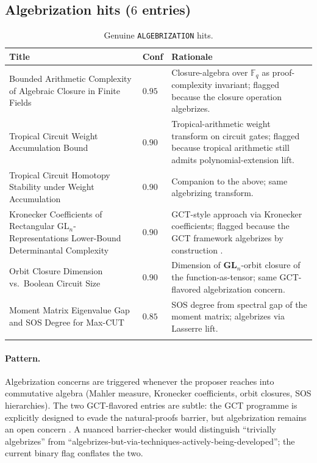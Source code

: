 \documentclass[11pt,a4paper]{article}
\begin{document}
\subsection{Algebrization hits ($6$ entries)}\label{sec:alg-genuine}

\begin{longtable}{p{3.5cm} p{0.8cm} p{10.0cm}}
\toprule
Title & Conf & Rationale \\
\midrule
Bounded Arithmetic Complexity of Algebraic Closure in Finite Fields & $0.95$ & Closure-algebra over $\mathbb{F}_q$ as proof-complexity invariant; flagged because the closure operation algebrizes. \\
Tropical Circuit Weight Accumulation Bound & $0.90$ & Tropical-arithmetic weight transform on circuit gates; flagged because tropical arithmetic still admits polynomial-extension lift. \\
Tropical Circuit Homotopy Stability under Weight Accumulation & $0.90$ & Companion to the above; same algebrizing transform. \\
Kronecker Coefficients of Rectangular GL$_n$-Representations Lower-Bound Determinantal Complexity & $0.90$ & GCT-style approach via Kronecker coefficients; flagged because the GCT framework algebrizes by construction \cite{MulmuleySohoni2001,BurgisserIkenmeyerPanova2019}. \\
Orbit Closure Dimension vs.\ Boolean Circuit Size & $0.90$ & Dimension of $\mathbf{GL}_n$-orbit closure of the function-as-tensor; same GCT-flavored algebrization concern. \\
Moment Matrix Eigenvalue Gap and SOS Degree for Max-CUT & $0.85$ & SOS degree from spectral gap of the moment matrix; algebrizes via Lasserre lift. \\
\bottomrule
\caption{Genuine \texttt{ALGEBRIZATION} hits.}\label{tab:alg-genuine}
\end{longtable}

\paragraph{Pattern.} Algebrization concerns are triggered whenever the
proposer reaches into commutative algebra (Mahler measure, Kronecker
coefficients, orbit closures, SOS hierarchies). The two GCT-flavored
entries are subtle: the GCT programme \cite{MulmuleySohoni2001} is
explicitly designed to evade the natural-proofs barrier, but
algebrization remains an open concern \cite{BurgisserIkenmeyerPanova2019}.
A nuanced barrier-checker would distinguish ``trivially algebrizes''
from ``algebrizes-but-via-techniques-actively-being-developed''; the
current binary flag conflates the two.
\end{document}
